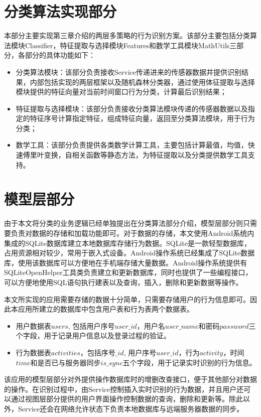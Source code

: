 \section{分类算法实现部分}
\par 本部分主要实现第三章介绍的两层多策略的行为识别方案。该部分主要包括分类算法模块Classifier，特征提取与选择模块Features和数学工具模块MathUtils三部分，各部分的具体功能如下：
\begin{itemize}
	\item 分类算法模块：该部分负责接收Service传递进来的传感器数据并提供识别结果，内部包括实现的两层框架以及随机森林分类器，通过使用体征提取与选择模块提供的特征向量对当前时间窗口行为分类，计算最后识别结果；
	\item 特征提取与选择模块：该部分负责接收分类算法模块传递的传感器数据以及指定的特征序号计算指定特征，组成特征向量，返回至分类算法模块，用于行为分类；
	\item 数学工具：该部分负责提供各类数学计算工具，主要包括计算最值，均值，快速傅里叶变换，自相关函数等静态方法，为特征提取以及分类提供数学工具支持。
\end{itemize}
\section{模型层部分}
\par 由于本文将分类的业务逻辑已经单独提出在分类算法部分介绍，模型层部分则只需要负责对数据的存储和加载功能即可。对于数据的存储，本文使用Android系统内集成的SQLite数据库建立本地数据库存储行为数据。SQLite是一款轻型数据库，占用资源相对较少，常用于嵌入式设备。Android操作系统已经集成了SQLite数据库，使用该数据库可以方便地在手机端存储大量数据。Android操作系统提供有SQLiteOpenHelper工具类负责建立和更新数据库，同时也提供了一些编程接口，可以方便地使用SQL语句执行建表以及查询，插入，删除和更新数据等操作。
\par 本文所实现的应用需要存储的数据十分简单，只需要存储用户的行为信息即可。因此本应用所建立的数据库中包含用户表和行为表两个数据表。
\begin{itemize}
	\item 用户数据表$users$, 包括用户序号$user\_id$，用户名$user\_name$和密码$password$三个字段，用于记录用户信息以及登录过程的验证。
	\item 行为数据表$activities$，包括序号$\_id$, 用户序号$user\_id$，行为$activity$，时间$time$和是否已与服务器同步$is\_sync$五个字段，用于记录实时识别的行为信息。
\end{itemize}
\par 该应用的模型层部分对外提供操作数据库时的增删改查接口，便于其他部分对数据的操作。在识别过程中，由Service控制插入实时识别的行为数据，并且用户还可以通过视图层部分提供的用户界面操作控制数据的查询，删除和更新等。除此以外，Service还会在网络允许状态下负责本地数据库与远端服务器数据的同步。

